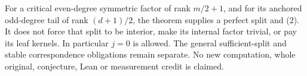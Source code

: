 \documentclass[11pt,a4paper]{article}
\begin{document}
For a critical even-degree symmetric factor of rank $m/2+1$,
and for its anchored odd-degree tail of rank $(d+1)/2$, the
theorem supplies a perfect split and (2). It does not force
that split to be interior, make its internal factor trivial,
or pay its leaf kernels. In particular $j=0$ is allowed.
The general sufficient-split and stable correspondence
obligations remain separate. No new computation, whole
original, conjecture, Lean or measurement credit is claimed.
\end{document}
